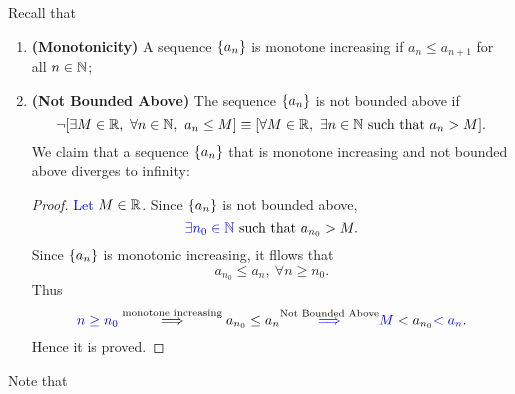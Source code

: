 \documentclass[11pt,openany]{article}
\begin{document}
\begin{note}
	Recall that \begin{enumerate}[]
	\item \textbf{(Monotonicity)} A sequence $\set{a_n}$ is monotone increasing if $a_n\leq a_{n+1}$ for all $n\in\mathbb{N}$;
	\item \textbf{(Not Bounded Above)} The sequence $\set{a_n}$ is not bounded above if \[
	\lnot[\exists M\in\R,\ \forall n\in\N,\ a_n\leq M]\equiv [\forall M\in\R,\ \exists n\in\N\ \text{such that}\ a_n>M].
	\] We claim that a sequence $\set{a_n}$ that is monotone increasing and not bounded above diverges to infinity:\par
	\begin{proof}
		\textcolor{blue}{Let $M\in\mathbb{R}$}. Since $\set{a_n}$ is not bounded above, \[
		\textcolor{blue}{\exists n_0\in\mathbb{N}}\ \text{such that}\ a_{n_0}>M.
		\] Since $\set{a_n}$ is monotonic increasing, it fllows that \[
		a_{n_0}\leq a_n,\ \forall n\geq n_0.
		\] Thus \[
		\textcolor{blue}{n\geq n_0}\overset{\text{monotone increasing}}{\implies} a_{n_0}\leq a_n\overset{\text{Not Bounded Above}}{\textcolor{blue}{\implies}}\textcolor{blue}{M}<a_{n_0}\textcolor{blue}{<a_n}.
		\] Hence it is proved.
	\end{proof}
\end{enumerate}
Note that
\end{note}
\end{document}

